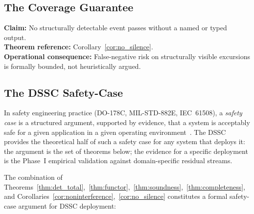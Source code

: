\documentclass[11pt,a4paper]{article}
\theoremstyle{plain}
\theoremstyle{definition}
\theoremstyle{remark}
\begin{document}
\subsection{The Coverage Guarantee}

\textbf{Claim:} No structurally detectable event passes without a named or typed output. \\
\textbf{Theorem reference:} Corollary~\ref{cor:no_silence}. \\
\textbf{Operational consequence:} False-negative risk on structurally visible excursions is
formally bounded, not heuristically argued.

\subsection{The DSSC Safety-Case}
\label{sec:safety_case}

In safety engineering practice (DO-178C, MIL-STD-882E, IEC~61508), a \emph{safety case}
is a structured argument, supported by evidence, that a system is acceptably safe for a
given application in a given operating environment~\cite{milstd882}. The DSSC provides the
theoretical half of such a safety case for any system that deploys it: the argument is
the set of theorems below; the evidence for a specific deployment is the Phase~I empirical
validation against domain-specific residual streams.

The combination of Theorems~\ref{thm:det_total},~\ref{thm:functor},~\ref{thm:soundness},~\ref{thm:completeness},
and Corollaries~\ref{cor:noninterference},~\ref{cor:no_silence} constitutes a formal
safety-case argument for DSSC deployment:
\end{document}
